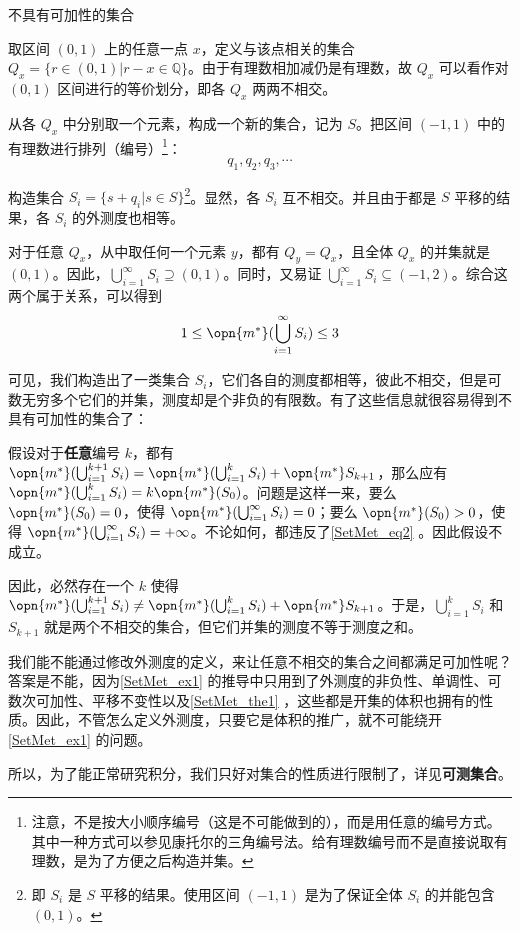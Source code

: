 \begin{example}{不具有可加性的集合}\label{SetMet_ex1}

取区间 $(0, 1)$ 上的任意一点 $x$，定义与该点相关的集合 $Q_x=\{r\in(0, 1)|r-x\in\mathbb{Q}\}$。由于有理数相加减仍是有理数，故 $Q_x$ 可以看作对 $(0, 1)$ 区间进行的等价划分，即各 $Q_x$ 两两不相交。

从各 $Q_x$ 中分别取一个元素，构成一个新的集合，记为 $S$。把区间 $(-1, 1)$ 中的有理数进行排列（编号）\footnote{注意，不是按大小顺序编号（这是不可能做到的），而是用任意的编号方式。其中一种方式可以参见康托尔的三角编号法。给有理数编号而不是直接说取有理数，是为了方便之后构造并集。}：
\begin{equation}
q_1, q_2, q_3, \cdots 
\end{equation}

构造集合 $S_i=\{s+q_i|s\in S\}$\footnote{即 $S_i$ 是 $S$ 平移的结果。使用区间 $(-1, 1)$ 是为了保证全体 $S_i$ 的并能包含 $(0, 1)$。}。显然，各 $S_i$ 互不相交。并且由于都是 $S$ 平移的结果，各 $S_i$ 的外测度也相等。

对于任意 $Q_x$，从中取任何一个元素 $y$，都有 $Q_y=Q_x$，且全体 $Q_x$ 的并集就是 $(0, 1)$。因此，$\bigcup_{i=1}^\infty S_i\supseteq (0, 1)$。同时，又易证 $\bigcup_{i=1}^\infty S_i\subseteq (-1, 2)$。综合这两个属于关系，可以得到
\begin{equation}\label{SetMet_eq2}
1\leq\opn{m^*}(\bigcup_{i=1}^\infty S_i)\leq 3
\end{equation}

可见，我们构造出了一类集合 $S_i$，它们各自的测度都相等，彼此不相交，但是可数无穷多个它们的并集，测度却是个非负的有限数。有了这些信息就很容易得到不具有可加性的集合了：

假设对于\textbf{任意}编号 $k$，都有 $\opn{m^*}(\bigcup_{i=1}^{k+1} S_i)=\opn{m^*}(\bigcup_{i=1}^k S_i)+\opn{m^*}S_{k+1}$，那么应有 $\opn{m^*}(\bigcup_{i=1}^{k} S_i)=k\opn{m^*}(S_0)$。问题是这样一来，要么 $\opn{m^*}(S_0)=0$，使得 $\opn{m^*}(\bigcup_{i=1}^\infty S_i)=0$；要么 $\opn{m^*}(S_0)>0$，使得 $\opn{m^*}(\bigcup_{i=1}^\infty S_i)=+\infty$。不论如何，都违反了\autoref{SetMet_eq2} 。因此假设不成立。

因此，必然存在一个 $k$ 使得 $\opn{m^*}(\bigcup_{i=1}^{k+1} S_i) \neq \opn{m^*}(\bigcup_{i=1}^k S_i)+\opn{m^*}S_{k+1}$。于是，$\bigcup_{i=1}^k S_i$ 和 $S_{k+1}$ 就是两个不相交的集合，但它们并集的测度不等于测度之和。


\end{example}

我们能不能通过修改外测度的定义，来让任意不相交的集合之间都满足可加性呢？答案是不能，因为\autoref{SetMet_ex1} 的推导中只用到了外测度的非负性、单调性、可数次可加性、平移不变性以及\autoref{SetMet_the1} ，这些都是开集的体积也拥有的性质。因此，不管怎么定义外测度，只要它是体积的推广，就不可能绕开\autoref{SetMet_ex1} 的问题。

所以，为了能正常研究积分，我们只好对集合的性质进行限制了，详见\textbf{可测集合}。


















